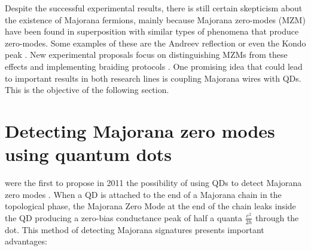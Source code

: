 Despite the successful experimental results, there is still certain  skepticism about the existence of Majorana fermions, mainly because Majorana zero-modes (MZM) have been found in superposition with similar types of phenomena that produce zero-modes. Some examples of these are the Andreev reflection \cite{sarma_majorana_2012} or even the Kondo peak \cite{gorski_interplay_2018}. New experimental proposals focus on distinguishing MZMs from these effects and implementing  braiding protocols \cite{aasen_milestones_2016,sarma_majorana_2015,heck_coulomb-assisted_2012}. One promising idea that could lead to important results in both research lines is coupling Majorana wires with QDs. This is the objective of the following section. 


\section{\label{sec:QDM}Detecting Majorana zero modes using quantum dots}

\citeauthor{liu_detecting_2011} were the first to propose in 2011 the possibility of using QDs to detect Majorana zero modes \cite{liu_detecting_2011} . When a QD is attached to the end of a Majorana chain in the topological phase,  the Majorana Zero Mode at the end of the chain leaks inside the QD \cite{vernek_subtle_2014} producing a zero-bias conductance peak of half a quanta $\frac{e^{2}}{2h}$ through the dot. This method of detecting Majorana signatures presents important advantages:

